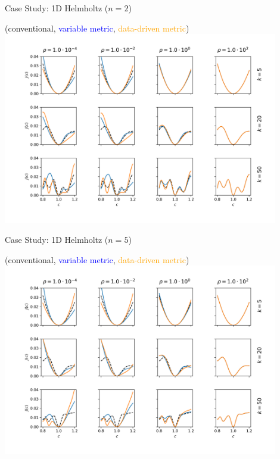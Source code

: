 \documentclass{beamer}
\begin{document}
\begin{frame}{Case Study: 1D Helmholtz ($n=2$)}
  \begin{center}
(conventional, \textcolor{blue}{variable metric}, \textcolor{orange}{data-driven metric})
\includegraphics[width=0.9\textwidth]{../paper/figures/Helmholtz1D_2.png}
  \end{center}
\end{frame}

\begin{frame}{Case Study: 1D Helmholtz ($n=5$)}
  \begin{center}
(conventional, \textcolor{blue}{variable metric}, \textcolor{orange}{data-driven metric})
\includegraphics[width=0.9\textwidth]{../paper/figures/Helmholtz1D_5.png}
  \end{center}
\end{frame}
\end{document}
